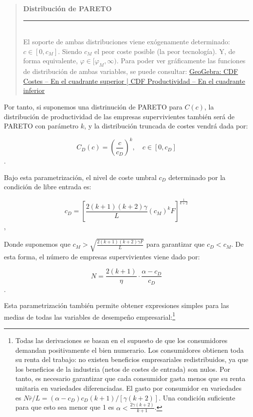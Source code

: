 \documentclass[10pt,a4paper]{article}
\newenvironment{specialblock}[1]{%
      \begin{quote} %
      \small %
      \noindent\textbf{#1}\\[-0.3em] %
      \rule{\linewidth}{0.4pt}\\[0.6em]}{
      \end{quote}}
\begin{document}
\begin{specialblock}{Distribución de PARETO}
    El soporte de ambas distribuciones viene exógenamente determinado: $c \in [0, c_M]$. Siendo $c_M$ el peor coste posible (la peor tecnología). Y, de forma equivalente, $\varphi\in[\varphi_M,\infty)$. Para poder ver gráficamente las funciones de distribución de ambas variables, se puede consultar: \href{https://www.geogebra.org/calculator/bf8nttpe}{GeoGebra: CDF Costes -- En el cuadrante superior | CDF Productividad -- En el cuadrante inferior}
\end{specialblock}


Por tanto, si suponemos una distrinución de PARETO para $C(c)$, la distribución de productividad de las empresas supervivientes también será de PARETO con parámetro $k$, y la distribución truncada de costes vendrá dada por:

$$C_D(c) = \left( \frac{c}{c_D} \right)^k, \quad c \in [0, c_D]$$.

Bajo esta parametrización, el nivel de coste umbral $c_D$ determinado por la condición de libre entrada es:

$$c_D = \left[ \frac{2(k + 1)(k + 2)\gamma}{L} (c_M)^k F \right]^{\frac{1}{k+2}}$$,

Donde suponemos que $c_M > \sqrt{\frac{2(k + 1)(k + 2)\gamma F}{L}}$ para garantizar que $c_D < c_M$. De esta forma, el número de empresas supervivientes viene dado por:

$$N= \frac{2(k + 1)}{\eta} \cdot \frac{\alpha - c_D}{c_D}$$.

Esta parametrización también permite obtener expresiones simples para las medias de todas las variables de desempeño empresarial:\footnote{%
    Todas las derivaciones se basan en el supuesto de que los consumidores demandan positivamente el bien numerario. Los consumidores obtienen toda su renta del trabajo: no existen beneficios empresariales redistribuidos, ya que los beneficios de la industria (netos de costes de entrada) son nulos. Por tanto, es necesario garantizar que cada consumidor gasta menos que su renta unitaria en variedades diferenciadas. El gasto por consumidor en variedades es $N\bar{r}/L = (\alpha - c_D)c_D (k + 1)/[\gamma (k + 2)]$. Una condición suficiente para que esto sea menor que 1 es $\alpha < \frac{2\gamma (k + 2)}{k + 1}$.
}
\end{document}
